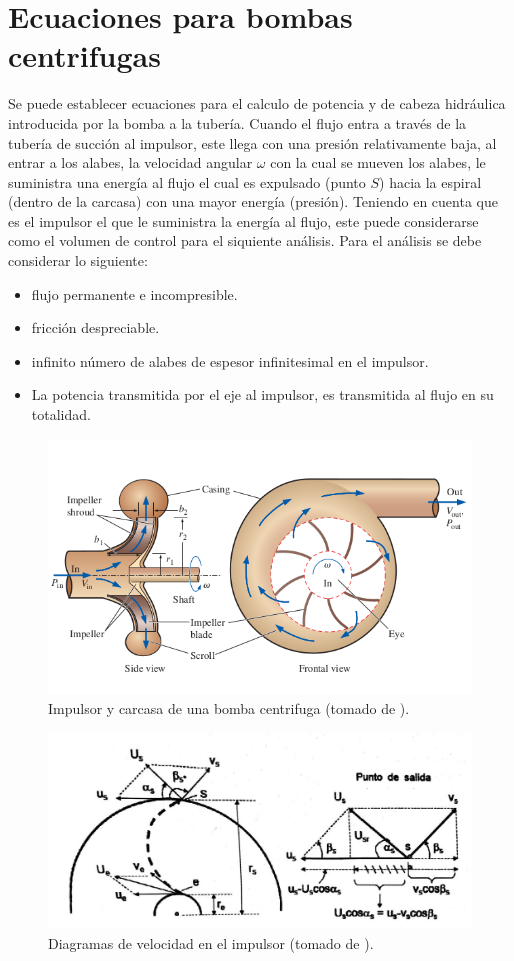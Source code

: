 \documentclass[11pt, oneside]{article}
\begin{document}
\section{Ecuaciones para bombas centrifugas}
Se puede establecer ecuaciones para el calculo de potencia y de cabeza hidr\'aulica introducida por la bomba a la tuber\'ia. Cuando el flujo entra a trav\'es de la tuber\'ia de succi\'on al impulsor, este llega con una presi\'on relativamente baja, al entrar a los alabes, la velocidad angular $\omega$ con la cual se mueven los alabes, le suministra una energ\'ia al flujo el cual es expulsado (punto $S$) hacia la espiral (dentro de la carcasa) con una mayor energ\'ia (presi\'on). Teniendo en cuenta que es el impulsor el que le suministra la energ\'ia al flujo, este puede considerarse como el volumen de control para el siquiente an\'alisis. Para el an\'alisis se debe considerar lo siguiente:
\begin{itemize} 
\item flujo permanente e incompresible.
\item fricci\'on despreciable.
\item infinito n\'umero de alabes de espesor infinitesimal en el impulsor. 
\item La potencia transmitida por el eje al impulsor, es transmitida al flujo en su totalidad.
\end{itemize} 

\begin{figure}[h]
\centering
\includegraphics[width=12cm]{./figs/bom1a.png}
\caption{Impulsor y carcasa de una bomba centrifuga (tomado de \cite{cengel2013ebook}).} 
\label{bom2}
\end{figure}


\begin{figure}[h]
\centering
\includegraphics[width=12cm]{./figs/bom2.jpeg}
\caption{Diagramas de velocidad en el impulsor (tomado de \cite{agudelo2011mecanica}).} 
\label{bom2}
\end{figure}
\end{document}

